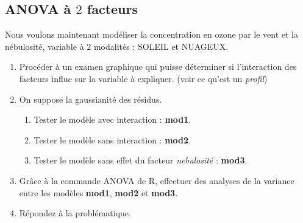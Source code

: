 \subsection{ANOVA à $2$ facteurs}

Nous voulons maintenant modéliser la concentration en ozone par le vent et la nébulosité, variable à $2$ modalités : SOLEIL et NUAGEUX.\\

\begin{enumerate}
\item Procéder à un examen graphique qui puisse déterminer si l'interaction des facteurs influe sur la variable à expliquer. (voir ce qu'est un \textit{profil})
\item On suppose la gaussianité des résidus. 
\begin{enumerate}
\item Tester le modèle avec interaction : \textbf{mod1}.
\item Tester le modèle sans interaction : \textbf{mod2}.
\item Tester le modèle sans effet du facteur \textit{nebulosité} : \textbf{mod3}.
\end{enumerate}
 \item Grâce à la commande ANOVA de R, effectuer des analyses de la variance entre les modèles \textbf{mod1}, \textbf{mod2} et \textbf{mod3}.
\item Répondez à la problématique.
\end{enumerate}
